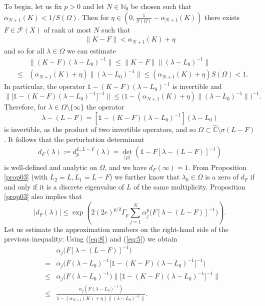 \documentclass[12pt,a4paper]{article}
\theoremstyle{definition}
\theoremstyle{remark}
\numberwithin{equation}{section}
\newcommand{\mc}{{\mathbb C}}
\begin{document}
To begin, let us fix $p> 0$ and let  $N\in\mathbb{N}_0$ be chosen such that $\alpha_{N+1}(K)< 1/{S(\Omega)}$. Then for $\eta \in (0,\frac{1}{S(\Omega)}-\alpha_{N+1}(K))$ there exists $F \in \mathcal{F}(X)$ of rank at most $N$ such that
\begin{align*}
 \|K-F\|<\alpha_{N+1}(K)+\eta
\end{align*}
and so for all $\lambda \in \Omega$ we can estimate
\begin{eqnarray*}
&& \|(K-F)(\lambda-L_0)^{-1}\| \leq \|K-F\|\|(\lambda-L_0)^{-1}\| \\
&\leq&  (\alpha_{N+1}(K)+\eta)\|(\lambda-L_0)^{-1}\| \leq (\alpha_{N+1}(K)+\eta)S(\Omega) 
< 1.  
\end{eqnarray*}
In particular, the operator $\mathds{1}-(K-F)(\lambda-L_0)^{-1}$ is invertible and
\begin{equation}
  \label{eq:5}
  \Big\| \big[\mathds{1}-(K-F)(\lambda-L_0)^{-1}\big]^{-1}\Big\| \leq \Big(1-(\alpha_{N+1}(K)+\eta)\|(\lambda-L_0)^{-1}\|\Big)^{-1}.
\end{equation}
Therefore, for $\lambda \in \Omega \setminus \{\infty\}$ the operator
\begin{equation}
  \label{eq:8}
  \lambda-(L-F)=[\mathds{1}-(K-F)(\lambda-L_0)^{-1}] (\lambda-L_0)
\end{equation}
is invertible, as the product of two invertible operators, and so $\Omega \subset \hat\mc \setminus \sigma(L-F)$. It follows that the perturbation determinant 
\begin{align}\label{defd}
 d_F(\lambda):= d_{p}^{L,L-F}(\lambda)={\det}_{\lceil p \rceil}(\mathds{1}-F[\lambda-(L-F)]^{-1})
\end{align}
is well-defined and analytic on $\Omega$, and we have $d_F(\infty)=1$. From Proposition  \ref{prop03} (with $L_2=L,L_1=L-F$) we further know that $\lambda_0 \in \Omega$ is a zero of $ d_{F}$ if and only if it is a discrete eigenvalue of $L$ of the same multiplicity. Proposition \ref{prop03} also implies that
\begin{equation*}
  |d_{F}(\lambda)| \leq \exp \left(2(2e)^{p/2} \Gamma_p \sum_{j=1}^N \alpha_j^p\Big(F[\lambda-(L-F)]^{-1}\Big) \right).
\end{equation*}
Let us estimate the approximation numbers on the right-hand side of the previous inequality: Using (\ref{eq:8}) and (\ref{eq:5}) we obtain
\begin{eqnarray*}
&& \alpha_j\Big(F[\lambda-(L-F)]^{-1}\Big)  \\
&=&  \alpha_j\Big(F(\lambda - L_0)^{-1}\big[\mathds{1}-(K-F)(\lambda-L_0)^{-1}\big]^{-1}\Big) \\
 &\leq& \alpha_j\Big(F(\lambda - L_0)^{-1}\Big)\Big\|\big[\mathds{1}-(K-F)(\lambda-L_0)^{-1}\big]^{-1}\Big\| \\
 &\leq& \frac{\alpha_j(F(\lambda - L_0)^{-1})}{1-(\alpha_{N+1}(K)+\eta)\|(\lambda-L_0)^{-1}\|}.  \end{eqnarray*}
\end{document}
